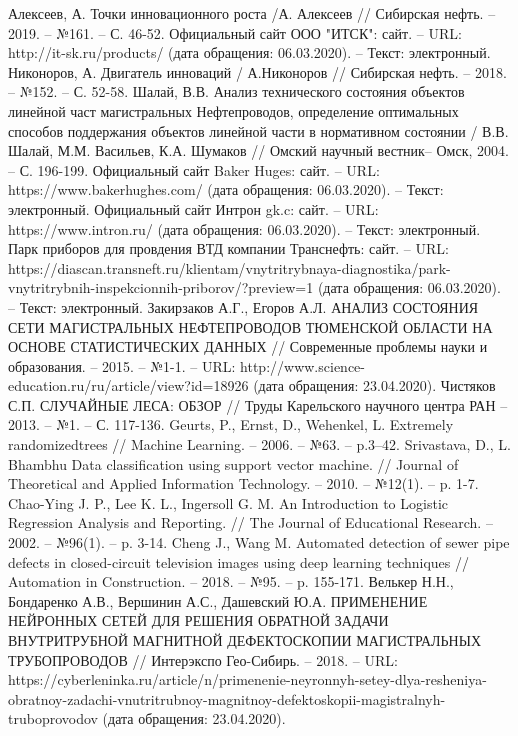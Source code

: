 \documentclass[a4paper,article,14pt]{extarticle}
\begin{document}
\begin{thebibliography}{1}
 Алексеев, А. Точки инновационного роста /А. Алексеев // \flqq Сибирская нефть\frqq. – 2019. – №161. – С. 46-52.
 Официальный сайт ООО "ИТСК": сайт. – URL: http://it-sk.ru/products/ (дата обращения: 06.03.2020). – Текст: электронный.
 Никоноров, А. Двигатель инноваций / А.Никоноров // \flqq Сибирская нефть\frqq. – 2018. – №152. – С. 52-58.
 Шалай, В.В. Анализ технического состояния объектов линейной част магистральных Нефтепроводов, определение оптимальных способов поддержания объектов линейной части в нормативном состоянии / В.В. Шалай, М.М. Васильев, К.А. Шумаков // \flqq Омский научный вестник\frqq – Омск, 2004. – С. 196-199.
 Официальный сайт \frqq Baker Huges\flqq: сайт. – URL: https://www.bakerhughes.com/ (дата обращения: 06.03.2020). – Текст: электронный.
 Официальный сайт \frqq Интрон gk.c\flqq: сайт. – URL: https://www.intron.ru/ (дата обращения: 06.03.2020). – Текст: электронный.
 Парк приборов для провдения ВТД компании \frqq Транснефть\flqq: сайт. – URL: https://diascan.transneft.ru/klientam/vnytritrybnaya-diagnostika/park-vnytritrybnih-inspekcionnih-priborov/?preview=1 (дата обращения: 06.03.2020). – Текст: электронный.
 Закирзаков А.Г., Егоров А.Л. АНАЛИЗ СОСТОЯНИЯ СЕТИ МАГИСТРАЛЬНЫХ НЕФТЕПРОВОДОВ ТЮМЕНСКОЙ ОБЛАСТИ НА ОСНОВЕ СТАТИСТИЧЕСКИХ ДАННЫХ // Современные проблемы науки и образования. – 2015. – №1-1. – URL: http://www.science-education.ru/ru/article/view?id=18926 (дата обращения: 23.04.2020).
 Чистяков С.П. СЛУЧАЙНЫЕ ЛЕСА: ОБЗОР // Труды Карельского научного центра РАН – 2013. – №1. – С. 117-136.
 Geurts, P., Ernst, D., Wehenkel, L. Extremely randomizedtrees // Machine Learning. – 2006. – №63. –  p.3–42.
 Srivastava, D., L. Bhambhu  Data classification  using  support  vector  machine. // Journal of Theoretical and Applied Information Technology. – 2010. – №12(1). – p. 1-7.
 Chao-Ying J. P., Lee K. L., Ingersoll G. M. An Introduction to Logistic Regression Analysis and Reporting. // The Journal of Educational Research. – 2002. – №96(1). – p. 3-14.
 Cheng J., Wang M. Automated detection of sewer pipe defects in closed-circuit television images using deep learning techniques // Automation in Construction. – 2018. – №95. – p. 155-171.
 Велькер Н.Н., Бондаренко А.В., Вершинин А.С., Дашевский Ю.А. ПРИМЕНЕНИЕ НЕЙРОННЫХ СЕТЕЙ ДЛЯ РЕШЕНИЯ ОБРАТНОЙ ЗАДАЧИ ВНУТРИТРУБНОЙ МАГНИТНОЙ ДЕФЕКТОСКОПИИ МАГИСТРАЛЬНЫХ ТРУБОПРОВОДОВ // Интерэкспо Гео-Сибирь. – 2018. – URL: https://cyberleninka.ru/article/n/primenenie-neyronnyh-setey-dlya-resheniya-obratnoy-zadachi-vnutritrubnoy-magnitnoy-defektoskopii-magistralnyh-truboprovodov (дата обращения: 23.04.2020).

\end{thebibliography}
\end{document}

